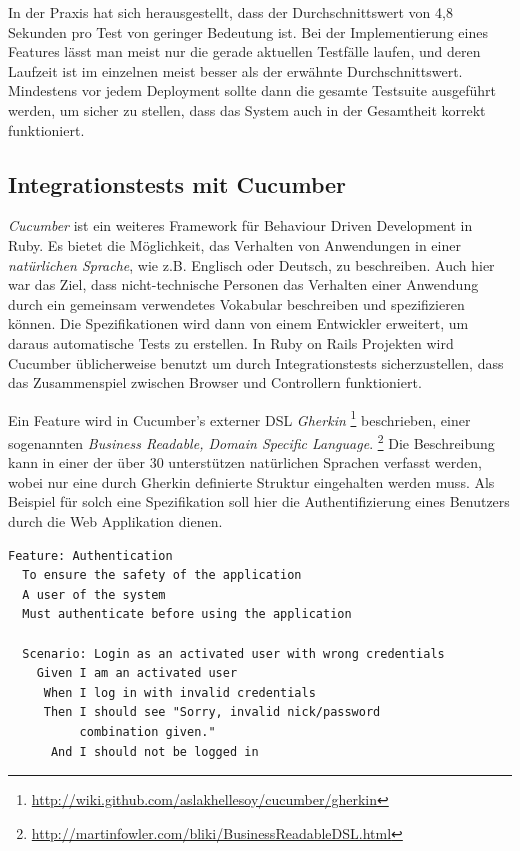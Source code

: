 In der Praxis hat sich herausgestellt, dass der Durchschnittswert von
4,8 Sekunden pro Test von geringer Bedeutung ist. Bei der
Implementierung eines Features lässt man meist nur die gerade
aktuellen Testfälle laufen, und deren Laufzeit ist im einzelnen meist
besser als der erwähnte Durchschnittswert. Mindestens vor jedem
Deployment sollte dann die gesamte Testsuite ausgeführt werden, um
sicher zu stellen, dass das System auch in der Gesamtheit korrekt
funktioniert.

\subsection{Integrationstests mit Cucumber}
\textit{Cucumber} \cite{cucumber} ist ein weiteres Framework für
Behaviour Driven Development in Ruby. Es bietet die Möglichkeit, das
Verhalten von Anwendungen in einer \textit{natürlichen Sprache}, wie
z.B. Englisch oder Deutsch, zu beschreiben. Auch hier war das Ziel,
dass nicht-technische Personen das Verhalten einer Anwendung durch ein
gemeinsam verwendetes Vokabular beschreiben und spezifizieren können.
Die Spezifikationen wird dann von einem Entwickler erweitert, um
daraus automatische Tests zu erstellen. In Ruby on Rails Projekten
wird Cucumber üblicherweise benutzt um durch Integrationstests
sicherzustellen, dass das Zusammenspiel zwischen Browser und
Controllern funktioniert.

Ein Feature wird in Cucumber's externer DSL \textit{Gherkin}
\footnote{\url{http://wiki.github.com/aslakhellesoy/cucumber/gherkin}}
beschrieben, einer sogenannten \textit{Business Readable, Domain
  Specific Language}.
\footnote{\url{http://martinfowler.com/bliki/BusinessReadableDSL.html}}
Die Beschreibung kann in einer der über 30 unterstützen natürlichen
Sprachen verfasst werden, wobei nur eine durch Gherkin definierte
Struktur eingehalten werden muss. Als Beispiel für solch eine
Spezifikation soll hier die Authentifizierung eines Benutzers durch
die Web Applikation dienen.

\begin{lstlisting}[caption=Spezifikation eines Features mit Cucumber]
Feature: Authentication
  To ensure the safety of the application
  A user of the system
  Must authenticate before using the application

  Scenario: Login as an activated user with wrong credentials
    Given I am an activated user
     When I log in with invalid credentials
     Then I should see "Sorry, invalid nick/password
          combination given."
      And I should not be logged in
\end{lstlisting}

